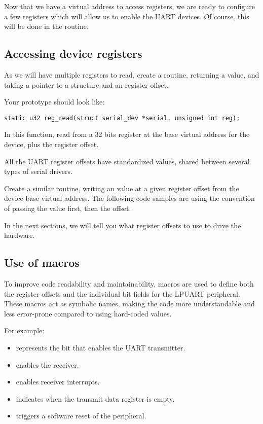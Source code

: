 Now that we have a virtual address to access registers, we are ready to
configure a few registers which will allow us to enable the UART
devices. Of course, this will be done in the  routine.

\subsection{Accessing device registers}

As we will have multiple registers to read, create a 
routine, returning a  value, and taking a 
pointer to a  structure and an 
register offset.

Your prototype should look like:
\begin{verbatim}
static u32 reg_read(struct serial_dev *serial, unsigned int reg);
\end{verbatim}

In this function, read from a 32 bits register at the base virtual
address for the device, plus the register offset.

All the UART register offsets have standardized values, shared between
several types of serial drivers.

Create a similar  routine, writing an 
value at a given register offset from the device base virtual address.
The following code samples are using
the  convention of passing the value first, then the
offset.

In the next sections, we will tell you what register offsets to use
to drive the hardware.


\subsection{Use of macros}

To improve code readability and maintainability, macros are used to define both the register offsets and the individual bit fields for the LPUART peripheral. These macros act as symbolic names, making the code more understandable and less error-prone compared to using hard-coded values.

For example:
\begin{itemize}
  \item {} represents the bit that enables the UART transmitter.
  \item {} enables the receiver.
  \item {} enables receiver interrupts.
  \item {} indicates when the transmit data register is empty.
  \item {} triggers a software reset of the peripheral.
\end{itemize}

